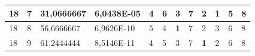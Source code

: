 \documentclass[conference]{IEEEtran}
\begin{document}
\begin{table}[]
\begin{tabular}{|llll|llllllll|}
\multicolumn{1}{|l|}{18}                                                    & \multicolumn{1}{l|}{7}                                                        & \multicolumn{1}{l|}{31,0666667}                                                   & 6,0438E-05                     & \multicolumn{1}{l|}{4}                                                  & \multicolumn{1}{l|}{6}                                                  & \multicolumn{1}{l|}{3}                                                  & \multicolumn{1}{l|}{7}                                                  & \multicolumn{1}{l|}{2}                                                  & \multicolumn{1}{l|}{\textbf{1}}                                         & \multicolumn{1}{l|}{5}                                                  & 8                          \\ \hline
\multicolumn{1}{|l|}{18}                                                    & \multicolumn{1}{l|}{8}                                                        & \multicolumn{1}{l|}{56,6666667}                                                   & 6,9626E-10                     & \multicolumn{1}{l|}{5}                                                  & \multicolumn{1}{l|}{4}                                                  & \multicolumn{1}{l|}{\textbf{1}}                                         & \multicolumn{1}{l|}{7}                                                  & \multicolumn{1}{l|}{2}                                                  & \multicolumn{1}{l|}{3}                                                  & \multicolumn{1}{l|}{6}                                                  & 8                          \\ \hline
\multicolumn{1}{|l|}{18}                                                    & \multicolumn{1}{l|}{9}                                                        & \multicolumn{1}{l|}{61,2444444}                                                   & 8,5146E-11                     & \multicolumn{1}{l|}{4}                                                  & \multicolumn{1}{l|}{5}                                                  & \multicolumn{1}{l|}{3}                                                  & \multicolumn{1}{l|}{7}                                                  & \multicolumn{1}{l|}{\textbf{1}}                                         & \multicolumn{1}{l|}{2}                                                  & \multicolumn{1}{l|}{6}                                                  & 8                          \\ \hline

\end{tabular}
\end{table}
\end{document}
